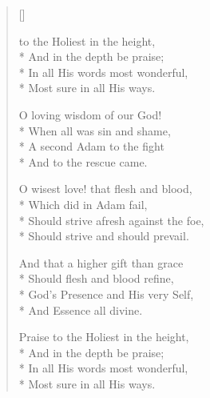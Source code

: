 \newHymn
{}

\begin{verse}[\versewidth]

\begin{altverse}
 to the Holiest in the height,\\*
And in the depth be praise;\\*
In all His words most wonderful,\\*
Most sure in all His ways.
\end{altverse}

\begin{altverse}
O loving wisdom of our God!\\*
When all was sin and shame,\\*
A second Adam to the fight\\*
And to the rescue came.
\end{altverse}

\begin{altverse}
O wisest love! that flesh and blood,\\*
Which did in Adam fail,\\*
Should strive afresh against the foe,\\*
Should strive and should prevail.
\end{altverse}

\begin{altverse}
And that a higher gift than grace\\*
Should flesh and blood refine,\\*
God’s Presence and His very Self,\\*
And Essence all divine.
\end{altverse}

\begin{altverse}
Praise to the Holiest in the height,\\*
And in the depth be praise;\\*
In all His words most wonderful,\\*
Most sure in all His ways.
\end{altverse}

\end{verse}

